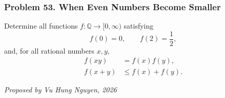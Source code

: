 \subsubsection*{Problem 53. When Even Numbers Become Smaller}

\begin{exercisebox}[hard]

Determine all functions $f:\mathbb Q\to[0,\infty)$ satisfying
\[
f(0)=0,\qquad f(2)=\frac12,
\]
and, for all rational numbers $x,y$,
\[
\boxed{
\begin{aligned}
f(xy)&=f(x)f(y),\\
f(x+y)&\le f(x)+f(y).
\end{aligned}}
\]

\begin{flushright}
\textit{Proposed by Vu Hung Nguyen, 2026}
\end{flushright}


\end{exercisebox}
